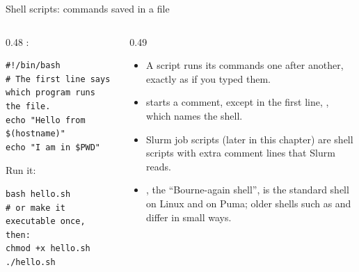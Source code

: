 \documentclass[aspectratio=169,11pt]{beamer}
\begin{document}
\begin{frame}[fragile]{Shell scripts: commands saved in a file}
\begin{columns}[T,onlytextwidth]
\begin{column}{0.48\textwidth}
:
\begin{lstlisting}[style=shell]
#!/bin/bash
# The first line says which program runs the file.
echo "Hello from $(hostname)"
echo "I am in $PWD"
\end{lstlisting}
Run it:
\begin{lstlisting}[style=shell]
bash hello.sh
# or make it executable once, then:
chmod +x hello.sh
./hello.sh
\end{lstlisting}
\end{column}
\begin{column}{0.49\textwidth}
\begin{itemize}\small
  \item A script runs its commands one after another, exactly as if you typed them.
  \item \code{\#} starts a comment, except in the first line, , which names the shell.
  \item Slurm job scripts (later in this chapter) are shell scripts with extra  comment lines that Slurm reads.
  \item {}, the ``Bourne-again shell'', is the standard shell on Linux and on Puma; older shells such as  and  differ in small ways.
\end{itemize}
\end{column}
\end{columns}
\end{frame}
\end{document}
